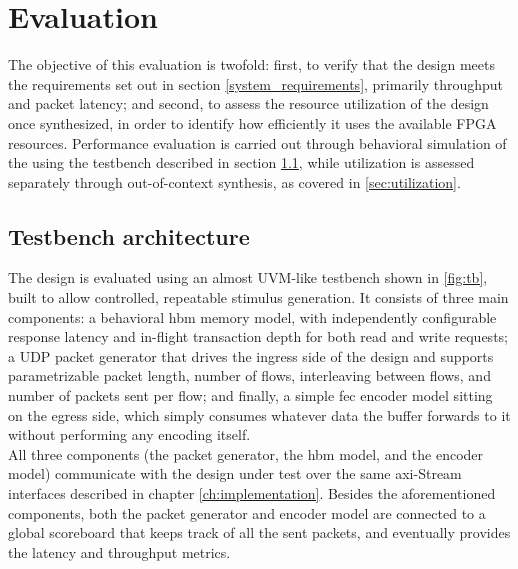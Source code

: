 \chapter{Evaluation}\label{ch:evaluation}
The objective of this evaluation is twofold: first, to verify that the design meets the
requirements set out in section \ref{system_requirements}, primarily throughput and packet
latency; and second, to assess the resource utilization of the design once synthesized, in
order to identify how efficiently it uses the available FPGA resources. Performance evaluation
is carried out through behavioral simulation of the  using the testbench described in
section \ref{sec:testbench-architecture}, while utilization is assessed separately through
out-of-context synthesis, as covered in \ref{sec:utilization}.

\section{Testbench architecture}\label{sec:testbench-architecture}

The design is evaluated using an almost UVM-like testbench shown in \ref{fig:tb}, built to allow controlled,
repeatable stimulus generation. It consists of three main components: a behavioral \gls{hbm} 
memory model, with independently configurable response latency and in-flight transaction depth for both read and write requests;
a UDP packet generator that drives the ingress side of the design and supports parametrizable packet length, number of flows,
interleaving between flows, and number of packets sent per flow; and finally, a simple \gls{fec} 
encoder model sitting on the egress side, which simply consumes whatever data the buffer forwards to it without
performing any encoding itself. \\

All three components (the packet generator, the \gls{hbm} model, and the encoder model) communicate with the design under test over the same
\gls{axi}-Stream interfaces described in chapter \ref{ch:implementation}. Besides the aforementioned components, 
both the packet generator and encoder model are connected to a global scoreboard that keeps track of all the sent packets, and eventually 
provides the latency and throughput metrics.

